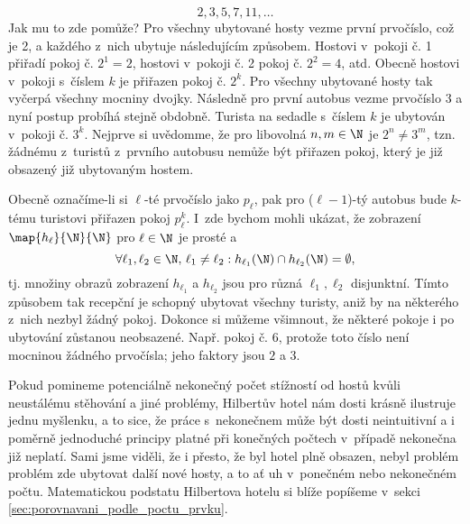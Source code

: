 \begin{enumerate}[label=\textit{(\roman*)}]
    \begin{equation*}
        2,3,5,7,11,\dots
    \end{equation*}
    Jak mu to zde pomůže? Pro všechny ubytované hosty vezme první prvočíslo, což je 2, a každého z~nich ubytuje následujícím způsobem. Hostovi v~pokoji č. 1 přiřadí pokoj č. $2^1=2$, hostovi v~pokoji č. 2 pokoj č. $2^2=4$, atd. Obecně hostovi v~pokoji s~číslem $k$ je přiřazen pokoj č. $2^k$. Pro všechny ubytované hosty tak vyčerpá všechny mocniny dvojky. Následně pro první autobus vezme prvočíslo 3 a nyní postup probíhá stejně obdobně. Turista na sedadle s~číslem $k$ je ubytován v~pokoji č. $3^k$. Nejprve si uvědomme, že pro libovolná $n,m\in\N$ je $2^n\neq 3^m$, tzn. žádnému z~turistů z~prvního autobusu nemůže být přiřazen pokoj, který je již obsazený již ubytovaným hostem.\par
    Obecně označíme-li si $\ell$-té prvočíslo jako $p_\ell$, pak pro ($\ell-1$)-tý autobus bude $k$-tému turistovi přiřazen pokoj $p_\ell^k$. I~zde bychom mohli ukázat, že zobrazení $\map{h_\ell}{\N}{\N}$ pro $\ell\in\N$ je prosté a
    \begin{equation*}
        \forall\ell_1,\ell_2\in\N,\,\ell_1\neq\ell_2: h_{\ell_1}(\N)\cap h_{\ell_2}(\N)=\emptyset,
    \end{equation*}
    tj. množiny obrazů zobrazení $h_{\ell_1}$ a $h_{\ell_2}$ jsou pro různá $\ell_1,\ell_2$ disjunktní. Tímto způsobem tak recepční je schopný ubytovat všechny turisty, aniž by na některého z~nich nezbyl žádný pokoj. Dokonce si můžeme všimnout, že některé pokoje i po ubytování zůstanou neobsazené. Např. pokoj č. 6, protože toto číslo není mocninou žádného prvočísla; jeho faktory jsou $2$ a $3$.
\end{enumerate}
Pokud pomineme potenciálně nekonečný počet stížností od hostů kvůli neustálému stěhování a jiné problémy, Hilbertův hotel nám dosti krásně ilustruje jednu myšlenku, a to sice, že práce s~nekonečnem může být dosti neintuitivní a i poměrně jednoduché principy platné při konečných počtech v~případě nekonečna již neplatí. Sami jsme viděli, že i přesto, že byl hotel plně obsazen, nebyl problém problém zde ubytovat další nové hosty, a to ať uh v~ponečném nebo nekonečném počtu. Matematickou podstatu Hilbertova hotelu si blíže popíšeme v~sekci \ref{sec:porovnavani_podle_poctu_prvku}.